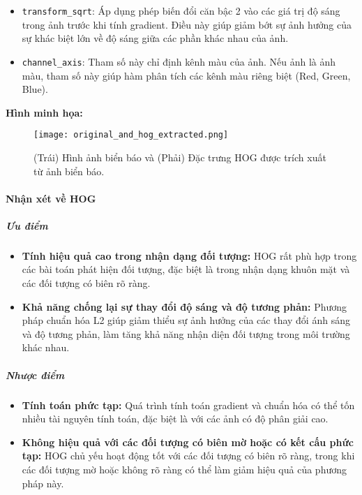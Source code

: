 \documentclass[a4paper,12pt]{article}
\begin{document}
\begin{itemize}
    \item \texttt{transform\_sqrt}: Áp dụng phép biến đổi căn bậc 2 vào các giá trị độ sáng trong ảnh trước khi tính gradient. Điều này giúp giảm bớt sự ảnh hưởng của sự khác biệt lớn về độ sáng giữa các phần khác nhau của ảnh.
    \item \texttt{channel\_axis}: Tham số này chỉ định kênh màu của ảnh. Nếu ảnh là ảnh màu, tham số này giúp hàm phân tích các kênh màu riêng biệt (Red, Green, Blue).
\end{itemize}

\noindent
\textbf{Hình minh họa:}
\begin{figure}[H]
    \centering
    \texttt{[image: original\_and\_hog\_extracted.png]}
    \caption{\centering (Trái) Hình ảnh biển báo và (Phải) Đặc trưng HOG được trích xuất từ ảnh biển báo.}
    \label{fig:hog}
\end{figure}

\paragraph{Nhận xét về HOG}

\subparagraph{Ưu điểm}
\begin{itemize}
    \item \textbf{Tính hiệu quả cao trong nhận dạng đối tượng:} HOG rất phù hợp trong các bài toán phát hiện đối tượng, đặc biệt là trong nhận dạng khuôn mặt và các đối tượng có biên rõ ràng.
    \item \textbf{Khả năng chống lại sự thay đổi độ sáng và độ tương phản:} Phương pháp chuẩn hóa L2 giúp giảm thiểu sự ảnh hưởng của các thay đổi ánh sáng và độ tương phản, làm tăng khả năng nhận diện đối tượng trong môi trường khác nhau.
\end{itemize}

\subparagraph{Nhược điểm}
\begin{itemize}
    \item \textbf{Tính toán phức tạp:} Quá trình tính toán gradient và chuẩn hóa có thể tốn nhiều tài nguyên tính toán, đặc biệt là với các ảnh có độ phân giải cao.
    \item \textbf{Không hiệu quả với các đối tượng có biên mờ hoặc có kết cấu phức tạp:} HOG chủ yếu hoạt động tốt với các đối tượng có biên rõ ràng, trong khi các đối tượng mờ hoặc không rõ ràng có thể làm giảm hiệu quả của phương pháp này.
\end{itemize}
\vspace{5mm}
\end{document}
